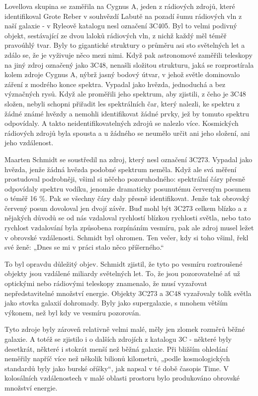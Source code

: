   Lovellova skupina se zaměřila na Cygnus A, jeden z rádiových zdrojů, které identifikoval Grote
  Reber v souhvězdí Labutě na pozadí šumu rádiových vln z naší galaxie - v Ryleově katalogu nesl
  označení 3C405. Byl to velmi podivný objekt, sestávající ze dvou laloků rádiových vln, z nichž
  každý měl téměř pravoúhlý tvar. Byly to gigantické struktury o průměru asi sto světelných let a
  zdálo se, že je vyživuje něco mezi nimi. Když pak astronomové zaměřili teleskopy na jiný zdroj
  označený jako 3C48, nenašli složitou strukturu, jaká se rozprostírala kolem zdroje Cygnus A, nýbrž
  jasný bodový útvar, v jehož světle dominovalo záření z modrého konce spektra. Vypadal jako hvězda,
  jednoduchá a bez význačných rysů. Když ale proměřili jeho spektrum, aby zjistili, z čeho je 3C48
  složen, nebyli schopni přiřadit les spektrálních čar, který nalezli, ke spektru z žádné známé
  hvězdy a nemohli identifikovat žádné prvky, jež by tomuto spektru odpovídaly. A takto
  neidentifikovatelných zdrojů se nalezlo více. Kosmických rádiových zdrojů byla spousta a u žádného
  se neumělo určit ani jeho složení, ani jeho vzdálenost. 

  Maarten Schmidt se soustředil na zdroj, který nesl označení 3C273. Vypadal jako hvězda, jenže
  žádná hvězda podobné spektrum neměla. Když ale svá měření prostudoval podrobněji, všiml si něčeho
  pozoruhodného: spektrální čáry přesně odpovídaly spektru vodíku, jenomže dramaticky posunutému
  červeným posunem o téměř 16 \%. Pak se všechny čáry daly přesně identifikovat. Jenže tak obrovský
  červený posun dovoloval jen dvojí závěr. Buď mohl být 3C273 celkem blízko a z nějakých důvodů se
  od nás vzdaloval rychlostí blízkou rychlosti světla, nebo tato rychlost vzdalování byla způsobena
  rozpínáním vesmíru, pak ale zdroj musel ležet v obrovské vzdálenosti. Schmidt byl ohromen. Ten
  večer, kdy si toho všiml, řekl své ženě: „Dnes se mi v práci stalo něco příšerného.“

  To byl opravdu důležitý objev. Schmidt zjistil, že tyto po vesmíru roztroušené objekty jsou
  vzdálené miliardy světelných let. To, že jsou pozorovatelné ať už optickými nebo rádiovými
  teleskopy znamenalo, že musí vyzařovat nepředstavitelné množství energie. Objekty 3C273 a 3C48
  vyzařovaly tolik světla jako stovka galaxií dohromady. Byly jako supergalaxie, s mnohem větším
  výkonem, než byl kdy ve vesmíru pozorován. 

  Tyto zdroje byly zároveň relativně velmi malé, měly jen zlomek rozměrů běžné galaxie. A totéž se
  zjistilo i o dalších zdrojích z katalogu 3C - některé byly desetkrát, některé i stokrát menší než
  běžná galaxie. Při bližším ohledání neměřily napříč více než několik bilionů kilometrů, „podle
  kosmologických standardů byly jako burské oříšky“, jak napsal v té době časopis Time. V
  kolosálních vzdálenostech v malé oblasti prostoru bylo produkováno obrovské množství energie.

